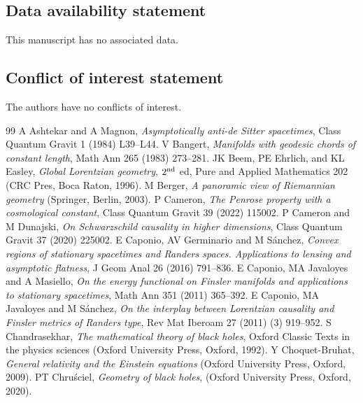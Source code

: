 \documentclass[12pt]{amsart}
\numberwithin{equation}{section}
\begin{document}
\subsection*{Data availability statement} This manuscript has no associated data.
\subsection*{Conflict of interest statement} The authors have no conflicts of interest.

\begin{thebibliography}{99}
 A Ashtekar and A Magnon, \emph{Asymptotically anti-de Sitter spacetimes}, Class Quantum Gravit 1 (1984) L39--L44.
 V Bangert, \emph{Manifolds with geodesic chords of constant length}, Math Ann 265 (1983) 273--281.
 JK Beem, PE Ehrlich, and KL Easley, \emph{Global Lorentzian geometry}, $2^{\rm nd}$ ed, Pure and Applied Mathematics 202 (CRC Pres, Boca Raton, 1996).
 M Berger, \emph{A panoramic view of Riemannian geometry} (Springer, Berlin, 2003).
 P Cameron, \emph{The Penrose property with a cosmological constant}, Class Quantum Gravit 39 (2022) 115002.
 P Cameron and M Dunajski, \emph{On Schwarzschild causality in higher dimensions}, Class Quantum Gravit 37 (2020) 225002.
E Caponio, AV Germinario and M Sánchez,
\emph{Convex regions of stationary spacetimes and Randers spaces. Applications to lensing and asymptotic flatness},
J Geom Anal 26 (2016) 791--836.
E Caponio, MA Javaloyes and A Masiello,
\emph{On the energy functional on Finsler manifolds and applications to stationary spacetimes}, Math Ann 351 (2011) 365--392.
E Caponio, MA Javaloyes and M Sánchez,
\emph{On the interplay between Lorentzian causality and Finsler metrics of Randers type},
Rev Mat Iberoam 27 (2011) (3) 919--952.
 S Chandrasekhar, \emph{The mathematical theory of black holes}, Oxford Classic Texts in the physics sciences (Oxford University Press, Oxford, 1992).
 Y Choquet-Bruhat, \emph{General relativity and the Einstein equations} (Oxford University Press, Oxford, 2009).
 PT Chru\'sciel, \emph{Geometry of black holes}, (Oxford University Press, Oxford, 2020).

\end{thebibliography}
\end{document}
